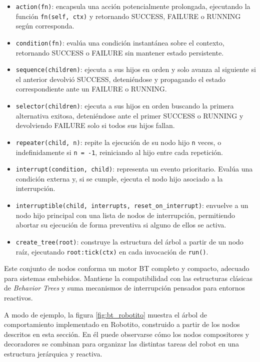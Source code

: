 \documentclass{prgrado}
\begin{document}
\begin{itemize}
    \item \texttt{action(fn)}: encapsula una acción potencialmente prolongada, ejecutando la función \texttt{fn(self, ctx)} y retornando SUCCESS, FAILURE o RUNNING según corresponda.

    \item \texttt{condition(fn)}: evalúa una condición instantánea sobre el contexto, retornando SUCCESS o FAILURE sin mantener estado persistente.

    \item \texttt{sequence(children)}: ejecuta a sus hijos en orden y solo avanza al siguiente si el anterior devolvió SUCCESS, deteniéndose y propagando el estado correspondiente ante un FAILURE o RUNNING.

    \item \texttt{selector(children)}: ejecuta a sus hijos en orden buscando la primera alternativa exitosa, deteniéndose ante el primer SUCCESS o RUNNING y devolviendo FAILURE solo si todos sus hijos fallan.

    \item \texttt{repeater(child, n)}: repite la ejecución de su nodo hijo \texttt{n} veces, o indefinidamente si \texttt{n = -1}, reiniciando al hijo entre cada repetición.

    \item \texttt{interrupt(condition, child)}: representa un evento prioritario. Evalúa una condición externa y, si se cumple, ejecuta el nodo hijo asociado a la interrupción.

    \item \texttt{interruptible(child, interrupts, reset\_on\_interrupt)}: envuelve a un nodo hijo principal con una lista de nodos de interrupción, permitiendo abortar su ejecución de forma preventiva si alguno de ellos se activa.

    \item \texttt{create\_tree(root)}: construye la estructura del árbol a partir de un nodo raíz, ejecutando \texttt{root:tick(ctx)} en cada invocación de \texttt{run()}.
\end{itemize}

Este conjunto de nodos conforma un motor BT completo y compacto, adecuado para sistemas embebidos. Mantiene la compatibilidad con las estructuras clásicas de \textit{Behavior Trees} y suma mecanismos de interrupción pensados para entornos reactivos.

A modo de ejemplo, la figura \ref{fig:bt_robotito} muestra el árbol de comportamiento implementado en Robotito, construido a partir de los nodos descritos en esta sección. En él puede observarse cómo los nodos compositores y decoradores se combinan para organizar las distintas tareas del robot en una estructura jerárquica y reactiva.
\end{document}
